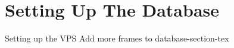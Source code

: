 \section{Setting Up The Database}
    
    \frame{\sectionpage}
    
    \begin{frame}{Setting up the VPS}
         \centering
         \huge{Add more frames to database-section-tex}
    \end{frame}
